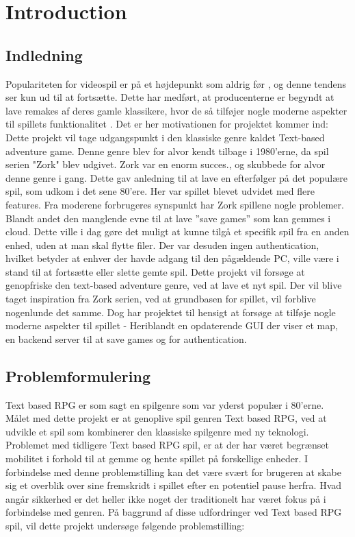 \section{Introduction}
\subsection{Indledning}

Populariteten for videospil er på et højdepunkt som aldrig før \cite{REFERENCE}, og denne tendens ser kun ud til at fortsætte. Dette har medført, at producenterne er begyndt at lave remakes af deres gamle klassikere, hvor de så tilføjer nogle moderne aspekter til spillets funktionalitet \cite{REFERENCE}. Det er her motivationen for projektet kommer ind: \\

Dette projekt vil tage udgangspunkt i den klassiske genre kaldet Text-based adventure game. Denne genre blev for alvor kendt tilbage i 1980'erne, da spil serien "Zork" blev udgivet. Zork var en enorm succes\cite{REFERENCE}., og skubbede for alvor denne genre i gang. 
Dette gav anledning til at lave en efterfølger på det populære spil, som udkom i det sene 80’ere. Her var spillet blevet udvidet med flere features.
Fra moderene forbrugeres synspunkt har Zork spillene nogle problemer. Blandt andet den manglende evne til at lave ”save games” som kan gemmes i cloud. Dette ville i dag gøre det muligt at kunne tilgå et specifik spil fra en anden enhed, uden at man skal flytte filer. Der var desuden ingen authentication, hvilket betyder at enhver der havde adgang til den pågældende PC, ville være i stand til at fortsætte eller slette gemte spil. 
Dette projekt vil forsøge at genopfriske den text-based adventure genre, ved at lave et nyt spil. Der vil blive taget inspiration fra Zork serien, ved at grundbasen for spillet, vil forblive nogenlunde det samme. Dog har projektet til hensigt at forsøge at tilføje nogle moderne aspekter til spillet - Heriblandt en opdaterende GUI der viser et map, en backend server til at save games og for authentication.




\subsection{Problemformulering}
Text based RPG er som sagt en spilgenre som var yderst populær i 80’erne. Målet med dette projekt er at genoplive spil genren Text based RPG, ved at udvikle et spil som kombinerer den klassiske spilgenre med ny teknologi. Problemet med tidligere Text based RPG spil, er at der har været begrænset mobilitet i forhold til at gemme og hente spillet på forskellige enheder. I forbindelse med denne problemstilling kan det være svært for brugeren at skabe sig et overblik over sine fremskridt i spillet efter en potentiel pause herfra. Hvad angår sikkerhed er det heller ikke noget der traditionelt har været fokus på i forbindelse med genren. På baggrund af disse udfordringer ved Text based RPG spil, vil dette projekt undersøge følgende problemstilling: \\

